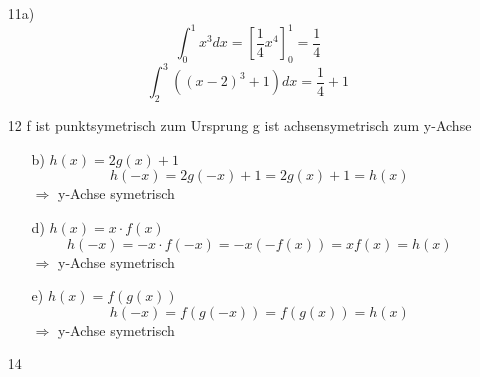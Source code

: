\documentclass{book}
\begin{document}
\begin{itemize}
    \item[11a)]
        \[ \int_0^1x^3dx = [\frac{1}{4}x^4]_0^1 = \frac{1}{4} \]
        \[ \int_2^3 ((x-2)^3+1)dx = \frac{1}{4} + 1\]
    \item[12]
        f ist punktsymetrisch zum Ursprung
        g ist achsensymetrisch zum y-Achse
        \begin{enumerate}
            \item[b)] $h(x) = 2g(x) +1$
                \[h(-x) = 2g(-x) +1 = 2g(x) +1 = h(x) \]
                $\Rightarrow$ y-Achse symetrisch
            \item[d)] $h(x) = x \cdot f(x)$
                \[h(-x) = -x \cdot f(-x) = -x (-f(x)) = xf(x) = h(x)\]
                $\Rightarrow$ y-Achse symetrisch
            \item[e)] $ h(x) = f(g(x))$
                \[h(-x) = f(g(-x)) = f(g(x)) =h(x)\]
                $\Rightarrow$ y-Achse symetrisch
        \end{enumerate}            
    \item[14]
        
\end{itemize}
\end{document}
